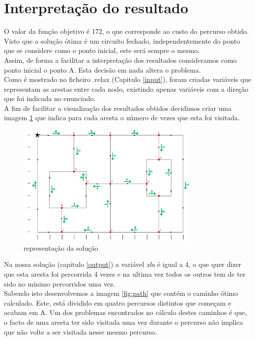 \documentclass[a4paper]{report}
\begin{document}
\section{Interpretação do resultado}
\label{solution}
O valor da função objetivo é 172, o que corresponde ao custo do percurso
obtido.\\
Visto que a solução ótima é um circuito fechado, independentemente do ponto
que se considere como o ponto inicial, este será sempre o mesmo. \\
Assim, de forma a facilitar a interpretação dos resultados consideramos como
ponto inicial o ponto A. Esta decisão em nada altera o problema.\\
Como é mostrado no ficheiro .relax (Capitulo \ref{input}), foram criadas
variáveis que representam as arestas entre cada nodo, existindo apenas variáveis
com a direção que foi indicada no enunciado. \\
A fim de facilitar a visualização dos resultados obtidos decidimos criar uma
imagem \ref{fig:visited} que indica para cada aresta o número de vezes que esta
foi visitada.

\begin{figure}[H]
    \begin{center}
        \includegraphics[width=0.8\textwidth]{images/desafioVisited.png}\par
        \caption{representação da solução}
        \label{fig:visited}
    \end{center}
\end{figure}
Na nossa solução (capitulo \ref{output}) a variável \textit{xla} é igual a 4, o
que quer dizer que esta aresta foi percorrida 4 vezes e na ultima vez todos os
outros tem de ter sido no mínimo percorridos uma vez.\\
Sabendo isto desenvolvemos a imagem \ref{fig:path} que contém o caminho ótimo
calculado. Este, está dividido em quatro percursos distintos que começam e
acabam em A.
Um dos problemas encontrados no cálculo destes caminhos é que, o facto de uma
aresta ter sido visitada uma vez durante o percurso não implica que não volte a
ser visitada nesse mesmo percurso.
\end{document}
